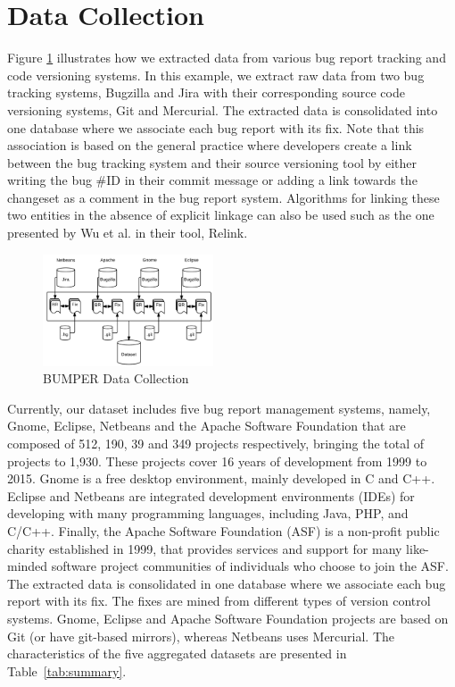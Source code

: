 \documentclass{sig-alternate-05-2015}
\begin{document}
\section{Data Collection}
\label{sec:Data Collection}

Figure \ref{fig:bumper-dc} illustrates how we extracted
data from various bug report tracking and code
versioning systems. In this example, we extract raw data
from two bug tracking systems, Bugzilla and Jira with their
corresponding source code versioning systems, Git and
Mercurial. The extracted data is consolidated into one
database where we associate
each bug report with its fix. Note that this association is
based on the general practice where developers create a link
between the bug tracking system and their source versioning
tool by either writing the bug \#ID in their commit message or
adding a link towards the changeset as a comment in the bug
report system. Algorithms for linking these two entities in
the absence of explicit linkage can also be used such as the
one presented by Wu et al. \cite{Wu2011} in their tool, Relink.


\begin{figure}
  \centering
  \includegraphics[width=0.45\textwidth]{media/dc.png}
  \caption{BUMPER Data Collection\label{fig:bumper-dc}}
\end{figure}


Currently, our dataset includes five bug report management systems, namely, Gnome, Eclipse, Netbeans and the Apache Software Foundation that are composed
of 512, 190, 39 and 349 projects respectively,
bringing the total of projects to 1,930.
These projects cover 16 years of development from 1999 to 2015.
Gnome is a free desktop environment, mainly developed in C and C++.
Eclipse and Netbeans are integrated development environments (IDEs) for
developing with many programming languages, including Java, PHP, and C/C++.
Finally, the Apache Software Foundation (ASF) is a non-profit public charity
established in 1999, that provides services and support for many like-minded
software project communities of individuals who choose to join the ASF.
The extracted data is consolidated in one database where we associate each bug report with its fix.
The fixes are mined from different types of version control systems.
Gnome, Eclipse and Apache Software Foundation projects are based on Git
 (or have git-based mirrors), whereas Netbeans uses Mercurial.
The characteristics of the five aggregated datasets
are presented in Table~\ref{tab:summary}.
\end{document}
